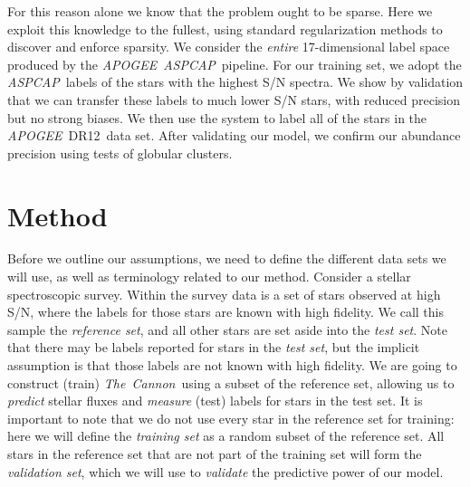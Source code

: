 \documentclass[12pt,preprint]{aastex6}
\newcommand{\project}[1]{\textsl{#1}}
\newcommand{\TheCannon}{\project{The~Cannon}}
\newcommand{\acronym}[1]{{\small{#1}}}
\newcommand{\apogee}{\project{\acronym{APOGEE}}}
\newcommand{\aspcap}{\project{\acronym{ASPCAP}}}
\newcommand{\dr}{\acronym{DR12}}
\begin{document}
For this reason alone we know that the problem ought to be sparse.  Here we exploit this 
knowledge to the fullest, using standard regularization methods to discover
and enforce sparsity.  We consider the \emph{entire} 17-dimensional label space 
produced by the \apogee\ \aspcap\ pipeline.  For our training set, we adopt the \aspcap\ labels of the stars with 
the highest S/N spectra.  We show by validation that we can transfer these labels to much 
lower S/N stars, with reduced precision but no strong biases.  We then use the
system to label all of the stars in the \apogee\ \dr\ data set.  After
validating our model, we confirm our abundance precision using tests of globular
clusters.


\section{Method}


Before we outline our assumptions, we need to define the different data sets we
will use, as well as terminology related to our method. Consider a stellar spectroscopic
survey.  Within the survey data is a set of stars observed at high S/N, where the labels for those stars are known with high
fidelity.  We call this sample the \emph{reference set}, and all other stars
are set aside into the \emph{test set}.  Note that there may be labels
reported for stars in the \emph{test set}, but the implicit assumption is
that those labels are not known with high fidelity.  We are going to construct
(train) \TheCannon\ using a subset of the reference set, allowing us to 
\emph{predict} stellar fluxes and \emph{measure} (test) labels for stars in the 
test set.  It is important to note that we do not use every star in the
reference set for training: here we will define the \emph{training set} as a random
subset of the reference set.  All stars in the reference set that are not part of 
the training set will form the \emph{validation set}, which we will use to 
\emph{validate} the predictive power of our model.
\end{document}
